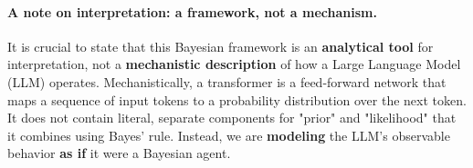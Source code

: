 \documentclass{article}
\theoremstyle{definition}
\begin{document}
\paragraph{A note on interpretation: a framework, not a mechanism.}
It is crucial to state that this Bayesian framework is an \textbf{analytical tool} for interpretation, not a \textbf{mechanistic description} of how a Large Language Model (LLM) operates.
Mechanistically, a transformer is a feed-forward network that maps a sequence of input tokens to a probability distribution over the next token. It does not contain literal, separate components for "prior" and "likelihood" that it combines using Bayes' rule.
Instead, we are \textbf{modeling} the LLM's observable behavior \textbf{as if} it were a Bayesian agent.
    

\end{document}
